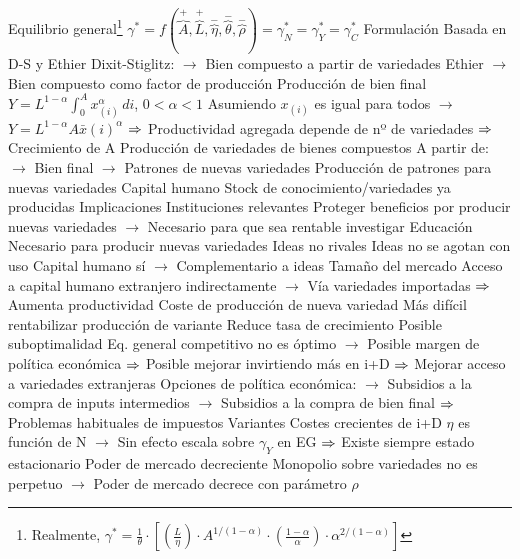 \documentclass{nuevotema}
\begin{document}
\begin{esquemal}
				\4 Equilibrio general\footnote{Realmente, $\gamma^* = \frac{1}{\theta} \cdot \left[ \left( \frac{L}{\eta} \right) \cdot A^{1/(1-\alpha)} \cdot \left( \frac{1-\alpha}{\alpha} \right) \cdot \alpha^{2/(1-\alpha)} \right]$}
				\4[] $\gamma^* = f\left( \overbrace{A}^+, \overbrace{L}^+, \overbrace{\eta}^-, \overbrace{\theta}^-, \overbrace{\rho}^- \right) = \gamma^*_N = \gamma^*_Y = \gamma^*_C $
			\3 Formulación
				\4 Basada en D-S y Ethier
				\4[] Dixit-Stiglitz:
				\4[] $\to$ Bien compuesto a partir de variedades
				\4[] Ethier
				\4[] $\to$ Bien compuesto como factor de producción
				\4 Producción de bien final
				\4[] $Y = L^{1-\alpha} \int_0^A x_(i)^\alpha \, di$, $0 < \alpha < 1$
				\4[] Asumiendo $x_(i)$ es igual para todos
				\4[] $\to$ $Y = L^{1-\alpha} A \bar{x}(i)^\alpha$
				\4[] $\Rightarrow$ Productividad agregada depende de nº de variedades
				\4[] $\Rightarrow$ Crecimiento de A
				\4 Producción de variedades de bienes compuestos
				\4[] A partir de:
				\4[] $\to$ Bien final
				\4[] $\to$ Patrones de nuevas variedades
				\4 Producción de patrones para nuevas variedades
				\4[] Capital humano
				\4[] Stock de conocimiento/variedades ya producidas
			\3 Implicaciones
				\4 Instituciones relevantes
				\4[] Proteger beneficios por producir nuevas variedades
				\4[] $\to$ Necesario para que sea rentable investigar
				\4 Educación
				\4[] Necesario para producir nuevas variedades
				\4 Ideas no rivales
				\4[] Ideas no se agotan con uso
				\4[] Capital humano sí
				\4[] $\to$ Complementario a ideas
				\4 Tamaño del mercado
				\4[] Acceso a capital humano extranjero indirectamente
				\4[] $\to$ Vía variedades importadas
				\4[] $\Rightarrow$ Aumenta productividad
				\4 Coste de producción de nueva variedad
				\4[] Más difícil rentabilizar producción de variante
				\4[] Reduce tasa de crecimiento
				\4 Posible suboptimalidad
				\4[] Eq. general competitivo no es óptimo
				\4[] $\to$ Posible margen de política económica
				\4[] $\Rightarrow$ Posible mejorar invirtiendo más en i+D
				\4[] $\Rightarrow$ Mejorar acceso a variedades extranjeras
				\4[] Opciones de política económica:
				\4[] $\to$ Subsidios a la compra de inputs intermedios
				\4[] $\to$ Subsidios a la compra de bien final
				\4[] $\Rightarrow$ Problemas habituales de impuestos
			\3 Variantes
				\4 Costes crecientes de i+D
				\4[] $\eta$ es función de N
				\4[] $\to$ Sin efecto escala sobre $\gamma_Y$ en EG
				\4[] $\Rightarrow$ Existe siempre estado estacionario
				\4 Poder de mercado decreciente
				\4[] Monopolio sobre variedades no es perpetuo
				\4[] $\to$ Poder de mercado decrece con parámetro $\rho$

\end{esquemal}
\end{document}
